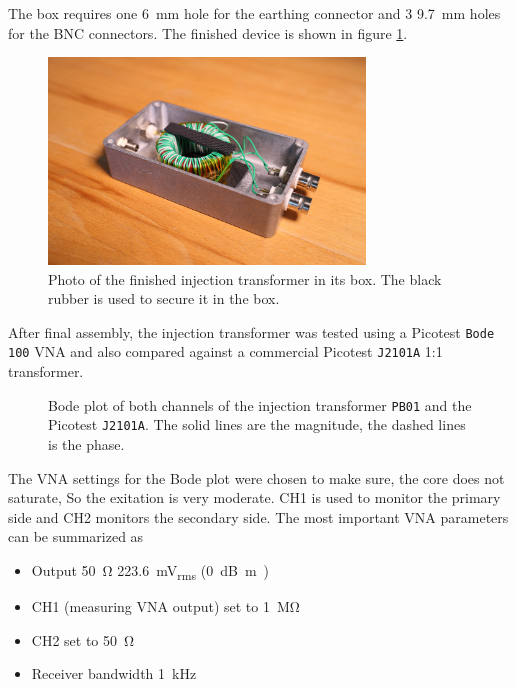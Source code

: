 \documentclass[12pt]{book}
\providecommand{\device}[1]{\texttt{\small #1}}
\begin{document}
The box requires one \qty{6}{\mm} hole for the earthing connector and 3 \qty{9.7}{\mm} holes for the BNC connectors. The finished device is shown in figure \ref{fig:injection_transformer_assembled}.

\begin{figure}[ht]
    \centering
    \includegraphics[width=0.75\textwidth]{../images/transformer_cropped.jpg}
    \caption{Photo of the finished injection transformer in its box. The black rubber is used to secure it in the box.}
    \label{fig:injection_transformer_assembled}
\end{figure}

After final assembly, the injection transformer was tested using a Picotest \device{Bode 100} VNA and also compared against a commercial Picotest \device{J2101A} 1:1 transformer.

\begin{figure}[hb!]
    \centering
    
    \caption{Bode plot of both channels of the injection transformer \device{PB01} and the Picotest \device{J2101A}. The solid lines are the magnitude, the dashed lines is the phase.}
    \label{fig:injection_transformer_bode}
\end{figure}

The VNA settings for the Bode plot were chosen to make sure, the core does not saturate, So the exitation is very moderate. CH1 is used to monitor the primary side and CH2 monitors the secondary side. The most important VNA parameters can be summarized as

\begin{itemize}
    \itemsep0em
    \item Output \qty{50}{\ohm} \qty{223.6}{\mV_{rms}} (\qty{0}{\dB m)}
    \item CH1 (measuring VNA output) set to \qty{1}{\mega\ohm}
    \item CH2 set to \qty{50}{\ohm}
    \item Receiver bandwidth \qty{1}{\kHz}
\end{itemize}
\end{document}
